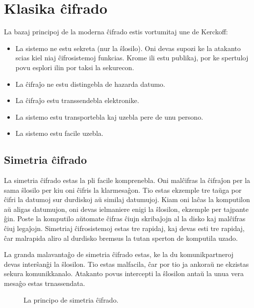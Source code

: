 \documentclass[utf8]{scrartcl}
\begin{document}
\section{Klasika ĉifrado}

La bazaj principoj de la moderna ĉifrado estis vortumitaj une de Kerckoff:
%
\begin{itemize}
\item La sistemo ne estu sekreta (nur la ŝlosilo). Oni devas supozi ke la
  atakanto scias kiel niaj ĉifrosistemoj funkcias. Krome ili estu publikaj, por
  ke spertuloj povu esplori ilin por taksi la sekurecon.
\item La ĉifraĵo ne estu distingebla de hazarda datumo.
\item La ĉifraĵo estu transsendebla elektronike.
\item La sistemo estu transportebla kaj uzebla pere de unu persono.
\item La sistemo estu facile uzebla.
\end{itemize}


\subsection{Simetria ĉifrado}

La simetria ĉifrado estas la pli facile komprenebla. Oni malĉifras la ĉifraĵon
per la sama ŝlosilo per kiu oni ĉifris la klarmesaĝon.  Tio estas ekzemple tre
taŭga por ĉifri la datumoj sur durdiskoj aŭ similaj datumujoj.  Kiam oni laĉas
la komputilon aŭ aligas datumujon, oni devas ielmaniere enigi la ŝlosilon,
ekzemple per tajpante ĝin. Poste la komputilo aŭtomate ĉifras ĉiujn skribaĵojn
al la disko kaj malĉifras ĉiuj legaĵojn.  Simetriaj ĉifrosistemoj estas tre
rapidaj, kaj devas esti tre rapidaj, ĉar malrapida aliro al durdisko bremsus la
tutan sperton de komputila uzado.

La granda malavantaĝo de simetria ĉifrado estas, ke la du komunikpartneroj
devas interŝanĝi la ŝlosilon. Tio estas malfacila, ĉar por tio ja ankoraŭ ne
ekzistas sekura komunikkanalo. Atakanto povus intercepti la ŝlosilon antaŭ la
unua vera mesaĝo estas trnassendata.

\begin{figure}
  \caption{La principo de simetria ĉifrado.}
\end{figure}
\end{document}
